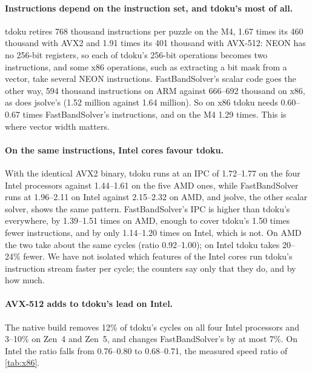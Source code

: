 \documentclass[11pt]{article}
\theoremstyle{definition}
\theoremstyle{plain}
\begin{document}
\paragraph{Instructions depend on the instruction set, and tdoku's most of all.} tdoku retires 768 thousand
instructions per puzzle on the M4, 1.67 times its 460 thousand with AVX2 and 1.91 times its 401 thousand with
AVX-512: NEON has no 256-bit registers, so each of tdoku's 256-bit operations becomes two instructions, and some x86
operations, such as extracting a bit mask from a vector, take several NEON instructions. FastBandSolver's scalar code
goes the other way, 594 thousand instructions on ARM against 666--692 thousand on x86, as does jsolve's (1.52 million
against 1.64 million). So on x86 tdoku needs 0.60--0.67 times FastBandSolver's instructions, and on the M4 1.29 times.
This is where vector width matters.

\paragraph{On the same instructions, Intel cores favour tdoku.} With the identical AVX2 binary, tdoku runs at an IPC of
1.72--1.77 on the four Intel processors against 1.44--1.61 on the five AMD ones, while FastBandSolver runs at 1.96--2.11
on Intel against 2.15--2.32 on AMD, and jsolve, the other scalar solver, shows the same pattern. FastBandSolver's IPC is
higher than tdoku's everywhere, by 1.39--1.51 times on AMD, enough to cover tdoku's 1.50 times fewer instructions, and
by only 1.14--1.20 times on Intel, which is not. On AMD the two take about the same cycles (ratio 0.92--1.00); on Intel
tdoku takes 20--24\% fewer. We have not isolated which features of the Intel cores run tdoku's instruction stream
faster per cycle; the counters say only that they do, and by how much.

\paragraph{AVX-512 adds to tdoku's lead on Intel.} The native build removes 12\% of tdoku's cycles on all four Intel
processors and 3--10\% on Zen~4 and Zen~5, and changes FastBandSolver's by at most 7\%. On Intel the ratio falls from
0.76--0.80 to 0.68--0.71, the measured speed ratio of \cref{tab:x86}.
\end{document}

